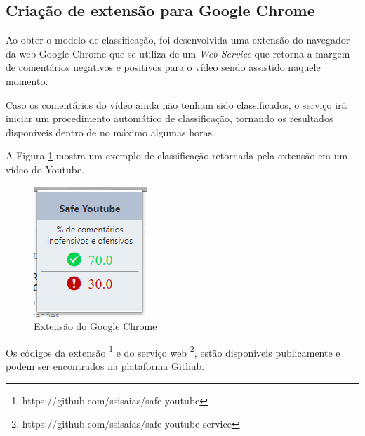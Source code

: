 \subsection{Criação de extensão para Google Chrome}

Ao obter o modelo de classificação, foi desenvolvida uma extensão do navegador da web Google Chrome que se utiliza de um \textit{Web Service} que retorna a margem de comentários negativos e positivos para o vídeo sendo assistido naquele momento. 

Caso os comentários do vídeo ainda não tenham sido classificados, o serviço irá iniciar um procedimento automático de classificação, tornando os resultados disponíveis dentro de no máximo algumas horas.

A Figura \ref{fig:chrome_plugin} mostra um exemplo de classificação retornada pela extensão em um vídeo do Youtube.

\begin{figure}[H] %
	\caption{\label{fig:chrome_plugin} Extensão do Google Chrome}
	\begin{center}
	    \includegraphics[scale=1.2]{figuras/extensao_chrome.PNG} %
	\end{center}
\end{figure}

Os códigos da extensão \footnote{https://github.com/ssisaias/safe-youtube} e do serviço web \footnote{https://github.com/ssisaias/safe-youtube-service}, estão disponíveis publicamente e podem ser encontrados na plataforma Github.

